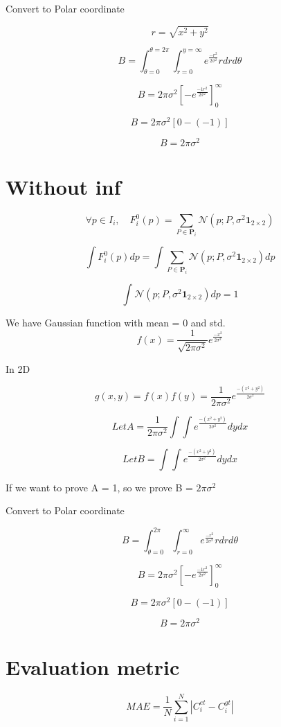 \documentclass[a4paper]{article}
\theoremstyle{definition}
\theoremstyle{plain}
\begin{document}
Convert to Polar coordinate 

\[ r = \sqrt{x^2 + y^2} \]

\[ B =  \int_{\theta=0}^{\theta=2\pi}\int_{r=0}^{y=\infty} e ^ \frac{-r^2}{2\sigma^2}rdrd\theta\]

\[ B =  2\pi\sigma^2 [-e^\frac{-1r^2}{2\sigma^2}]_0^{\infty} \]

\[ B =  2\pi\sigma^2 [0 - (-1)] \]

\[ B =  2\pi\sigma^2  \]

\section{Without inf}


\[ \forall p \in I_{i}, \quad F_{i}^{0}(p)=\sum_{P \in \mathbf{P}_{i}} \mathcal{N}\left(p ; P, \sigma^{2} \mathbf{1}_{2 \times 2}\right) \]


\[ \int   F_{i}^{0}(p) dp = \int \sum_{P \in \mathbf{P}_{i}} \mathcal{N}\left(p ; P, \sigma^{2} \mathbf{1}_{2 \times 2}\right) dp \]

\[ \int\mathcal{N}\left(p ; P, \sigma^{2} \mathbf{1}_{2 \times 2}\right) dp = 1 \]


We have Gaussian function with mean = 0 and std.
\[ f(x) = \frac{1}{\sqrt{2\pi\sigma^2}} e^\frac{-x^2}{2\sigma^2} \]


In 2D

\[ g(x, y) = f(x)f(y) = \frac{1}{2\pi\sigma^2} e^\frac{-(x^2+y^2)}{2\sigma^2} \]



\[ Let A = \frac{1}{2\pi\sigma^2} \int\int e^\frac{-(x^2+y^2)}{2\sigma^2} dydx\]

\[ Let B =  \int\int e^\frac{-(x^2+y^2)}{2\sigma^2} dydx\]

If we want to prove A = 1, so we prove B = $2\pi\sigma^2$

Convert to Polar coordinate

\[ B =  \int_{\theta=0}^{2\pi}\int_{r=0}^{\infty} e ^ \frac{-r^2}{2\sigma^2}rdrd\theta\]

\[ B =  2\pi\sigma^2 [-e^\frac{-1r^2}{2\sigma^2}]_0^{\infty} \]

\[ B =  2\pi\sigma^2 [0 - (-1)] \]

\[ B =  2\pi\sigma^2  \]

\section{Evaluation metric}

\begin{equation}M A E=\frac{1}{N} \sum_{i=1}^{N}\left|C_{i}^{e t}-C_{i}^{g t}\right|\end{equation}
\end{document}
